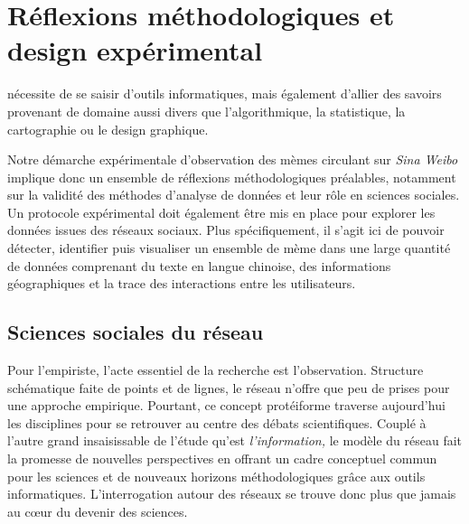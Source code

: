\chapter{Réflexions méthodologiques et design expérimental}

 nécessite de se saisir d'outils informatiques, mais également d'allier des savoirs provenant de domaine aussi divers que l'algorithmique, la statistique, la cartographie ou le design graphique.

Notre démarche expérimentale d'observation des mèmes circulant sur \textit{Sina Weibo} implique donc un ensemble de réflexions méthodologiques préalables, notamment sur la validité des méthodes d'analyse de données et leur rôle en sciences sociales. Un protocole expérimental doit également être mis en place pour explorer les données issues des réseaux sociaux. Plus spécifiquement, il s'agit ici de pouvoir détecter, identifier puis visualiser un ensemble de mème dans une large quantité de données comprenant du texte en langue chinoise, des informations géographiques et la trace des interactions entre les utilisateurs.


\section[Sciences sociales du réseau]{Sciences sociales du réseau}
Pour l{\textquoteright}empiriste, l{\textquoteright}acte essentiel de la recherche est l{\textquoteright}observation. Structure schématique faite de points et de lignes, le réseau n{\textquoteright}offre que peu de prises pour une approche empirique. Pourtant, ce concept protéiforme traverse aujourd{\textquoteright}hui les disciplines pour se retrouver au centre des débats scientifiques. Couplé à l{\textquoteright}autre grand insaisissable de l{\textquoteright}étude qu{\textquoteright}est \textit{l{\textquoteright}information, }le modèle du réseau fait la promesse de nouvelles perspectives en offrant un cadre conceptuel commun pour les sciences et de nouveaux horizons méthodologiques gr\^ace aux outils informatiques. L{\textquoteright}interrogation autour des réseaux se trouve donc plus que jamais au c{\oe}ur du devenir des sciences. 

